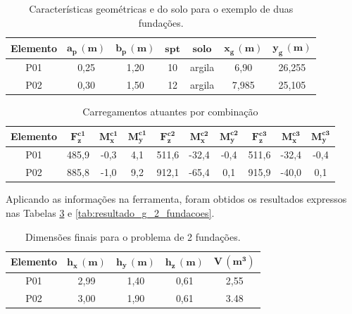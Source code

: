 \begin{table}[H]
\centering
\caption{Características geométricas e do solo para o exemplo de duas fundações.}
\label{tab:dois_elemento}
\setlength{\tabcolsep}{5pt}
\begin{tabular}{ c c c c c c c}
\toprule
\textbf{Elemento} &
$\mathbf{a_p \, (m)}$ &
$\mathbf{b_p \, (m)}$ &
$\mathbf{spt}$ &
$\mathbf{solo}$ &
$\mathbf{x_g \, (m)}$ &
$\mathbf{y_g \, (m)}$\\
\midrule
P01 & 0,25 & 1,20 & 10 & argila & 6,90 & 26,255 \\
P02 & 0,30 & 1,50 & 12 & argila & 7,985 & 25,105 \\
\bottomrule
\end{tabular}
\end{table}

\begin{table}[H]
\centering
\caption{Carregamentos atuantes por combinação}
\label{tab:carga_2_elementos}
\begin{tabular}{cccccccccc}
\toprule
\textbf{Elemento} &
$\mathbf{F_{z}^{c1}}$ &
$\mathbf{M_{x}^{c1}}$ &
$\mathbf{M_{y}^{c1}}$ &
$\mathbf{F_{z}^{c2}}$ &
$\mathbf{M_{x}^{c2}}$ &
$\mathbf{M_{y}^{c2}}$ &
$\mathbf{F_{z}^{c3}}$ &
$\mathbf{M_{x}^{c3}}$ &
$\mathbf{M_{y}^{c3}}$ \\
\midrule
P01 & 485,9 & -0,3 & 4,1 & 511,6 & -32,4 & -0,4 & 511,6 & -32,4 & -0,4 \\
P02 & 885,8 & -1,0 & 9,2 & 912,1 & -65,4 & 0,1  & 915,9 & -40,0 & 0,1  \\
\bottomrule
\end{tabular}
\end{table}


Aplicando as informações na ferramenta, foram obtidos os resultados expressos nas Tabelas \ref{tab:dimensoes_2_fundacoes} e \ref{tab:resultado_g_2_fundacoes}.

\begin{table}[H]
\centering
\caption{Dimensões finais para o problema de 2 fundações.}
\label{tab:dimensoes_2_fundacoes}
\begin{tabular}{ccccc}
\toprule
\textbf{Elemento} &
$\mathbf{h_x\,(m)}$ &
$\mathbf{h_y\,(m)}$ &
$\mathbf{h_z\,(m)}$ &
$\mathbf{V\,(m^3)}$\\
\midrule
P01 & 2,99 & 1,40 & 0,61 & 2,55\\
P02 & 3,00 & 1,90 & 0,61 &  3.48\\
\bottomrule
\end{tabular}
\end{table}




